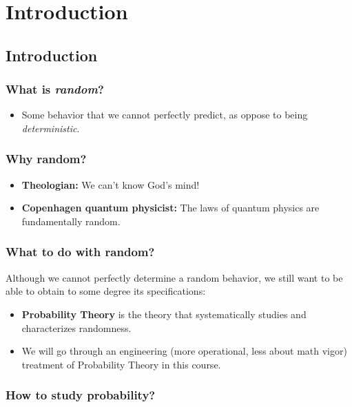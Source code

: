 \section{Introduction}

\subsection{Introduction}

\subsubsection{What is \textit{random}?}

\begin{itemize}
\item Some behavior that we cannot perfectly predict, as oppose to being \textit{deterministic}.
\end{itemize}

\subsubsection{Why random?}

\begin{itemize}
\item \textbf{Theologian:} We can't know God's mind!
\item \textbf{Copenhagen quantum physicist:} The laws of quantum physics are fundamentally random.
\end{itemize}

\subsubsection{What to do with random?}

Although we cannot perfectly determine a random behavior, we still want to be able to obtain to some degree its specifications:

\begin{itemize}
\item \textbf{Probability Theory} is the theory that systematically studies and characterizes randomness.
\item We will go through an engineering (more operational, less about math vigor) treatment of Probability Theory in this course.
\end{itemize}

\subsubsection{How to study probability?}

